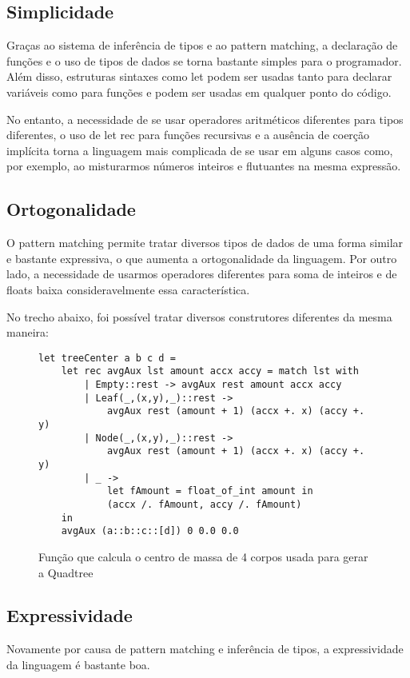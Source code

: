 \documentclass[a4paper,10pt]{article}
\begin{document}
	\subsection{Simplicidade}
		Graças ao sistema de inferência de tipos e ao pattern matching, a declaração de funções e o uso de tipos de dados se torna bastante simples para o programador. Além disso, estruturas sintaxes como let podem ser usadas tanto para declarar variáveis como para funções e podem ser usadas em qualquer ponto do código.
		
		No entanto, a necessidade de se usar operadores aritméticos diferentes para tipos diferentes, o uso de let rec para funções recursivas e a ausência de coerção implícita torna a linguagem mais complicada de se usar em alguns casos como, por exemplo, ao misturarmos números inteiros e flutuantes na mesma expressão.		
		
	\subsection{Ortogonalidade}
		O pattern matching permite tratar diversos tipos de dados de uma forma similar e bastante expressiva, o que aumenta a ortogonalidade da linguagem. Por outro lado, a necessidade de usarmos operadores diferentes para soma de inteiros e de floats baixa consideravelmente essa característica.
		
		No trecho abaixo, foi possível tratar diversos construtores diferentes da mesma maneira:
		\begin{figure}[H]
		\centering	
		\begin{lstlisting}
let treeCenter a b c d =
	let rec avgAux lst amount accx accy = match lst with
		| Empty::rest -> avgAux rest amount accx accy
		| Leaf(_,(x,y),_)::rest ->
			avgAux rest (amount + 1) (accx +. x) (accy +. y)
		| Node(_,(x,y),_)::rest ->
			avgAux rest (amount + 1) (accx +. x) (accy +. y)
		| _ ->
			let fAmount = float_of_int amount in
			(accx /. fAmount, accy /. fAmount)
	in
	avgAux (a::b::c::[d]) 0 0.0 0.0
		\end{lstlisting}
		\caption{Função que calcula o centro de massa de 4 corpos usada para gerar a Quadtree}
\end{figure}
		
	\subsection{Expressividade}
		Novamente por causa de pattern matching e inferência de tipos, a expressividade da linguagem é bastante boa.
		
\end{document}
